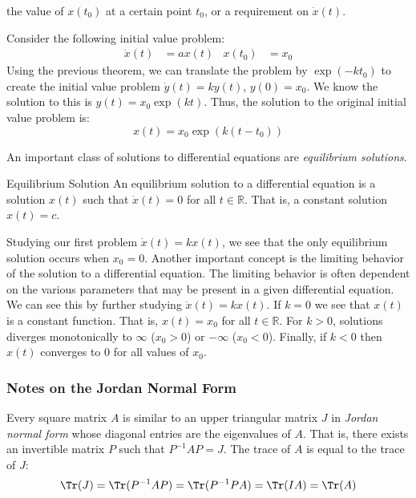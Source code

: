 \documentclass[crop=false,class=book,oneside]{standalone}
\begin{document}
        the value of $x(t_{0})$ at a certain point
        $t_{0}$, or a requirement on $\dot{x}(t)$.
        \begin{fexample}{}{}
            Consider the following initial value problem:
            \begin{align*}
                \dot{x}(t)&=ax(t)
                &
                x(t_{0})&=x_{0}
            \end{align*}
            Using the previous theorem, we can translate the
            problem by $\exp(-kt_{0})$ to create the initial
            value problem $\dot{y}(t)=ky(t)$, $y(0)=x_{0}$.
            We know the solution to this is
            $y(t)=x_{0}\exp(kt)$. Thus, the solution to the
            original initial value problem is:
            \begin{equation*}
                x(t)=x_{0}\exp(k(t-t_{0}))
            \end{equation*}
        \end{fexample}
        An important class of solutions to differential
        equations are \textit{equilibrium solutions}.
        \begin{fdefinition}{Equilibrium Solution}{}
            An equilibrium solution to a differential
            equation is a solution $x(t)$ such that
            $\dot{x}(t)=0$ for all $t\in\mathbb{R}$.
            That is, a constant solution $x(t)=c$.
        \end{fdefinition}
        Studying our first problem $\dot{x}(t)=kx(t)$,
        we see that the only equilibrium solution
        occurs when $x_{0}=0$. Another important concept
        is the limiting behavior of the solution to a
        differential equation. The limiting behavior
        is often dependent on the various parameters that
        may be present in a given differential equation.
        We can see this by further studying $\dot{x}(t)=kx(t)$.
        If $k=0$ we see that $x(t)$ is a constant function. That
        is, $x(t)=x_{0}$ for all $t\in\mathbb{R}$. For $k>0$,
        solutions diverges monotonically to $\infty$
        ($x_{0}>0$) or $-\infty$ ($x_{0}<0$).
        Finally, if $k<0$ then $x(t)$ converges to $0$
        for all values of $x_{0}$.
        \subsubsection{Notes on the Jordan Normal Form}
            Every square matrix $A$ is similar to an upper
            triangular matrix $J$ in
            \textit{Jordan normal form} whose diagonal entries
            are the eigenvalues of $A$. That is, there exists
            an invertible matrix $P$ such that $P^{-1}AP=J$.
            The trace of $A$ is equal to the trace of $J$:
            \begin{equation*}
                \Tr(J)
                =\Tr(P^{-1}AP)
                =\Tr(P^{-1}PA)
                =\Tr(IA)=\Tr(A)
            \end{equation*}
\end{document}
